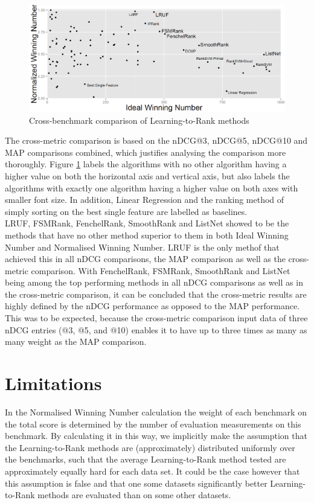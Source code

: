 \begin{figure}[!h]
\includegraphics[scale=0.33]{gfx/combined_normalized_winnum}
\caption{Cross-benchmark comparison of Learning-to-Rank methods}
\label{fig:normalised_winning_number_all}
\end{figure}

The cross-metric comparison is based on the \ac{nDCG}@3, \ac{nDCG}@5, \ac{nDCG}@10 and \ac{MAP} comparisons combined, which justifies analysing the comparison more thoroughly. Figure \ref{fig:normalised_winning_number_all} labels the algorithms with no other algorithm having a higher value on both the horizontal axis and vertical axis, but also labels the algorithms with exactly one algorithm having a higher value on both axes with smaller font size. In addition, Linear Regression and the ranking method of simply sorting on the best single feature are labelled as baselines.\\

LRUF, FSMRank, FenchelRank, SmoothRank and ListNet showed to be the methods that have no other method superior to them in both Ideal Winning Number and Normalised Winning Number. LRUF is the only methof that achieved this in all \ac{nDCG} comparisons, the \ac{MAP} comparison as well as the cross-metric comparison. With FenchelRank, FSMRank, SmoothRank and ListNet being among the top performing methods in all \ac{nDCG} comparisons as well as in the cross-metric comparison, it can be concluded that the cross-metric results are highly defined by the \ac{nDCG} performance as opposed to the \ac{MAP} performance. This was to be expected, because the cross-metric comparison input data of three \ac{nDCG} entries (@3, @5, and @10) enables it to have up to three times as many as many weight as the \ac{MAP} comparison.

\section{Limitations}
In the Normalised Winning Number calculation the weight of each benchmark on the total score is determined by the number of evaluation measurements on this benchmark. By calculating it in this way, we implicitly make the assumption that the Learning-to-Rank methods are (approximately) distributed uniformly over the benchmarks, such that the average Learning-to-Rank method tested are approximately equally hard for each data set. It could be the case however that this assumption is false and that one some datasets significantly better Learning-to-Rank methods are evaluated than on some other datasets.\\

